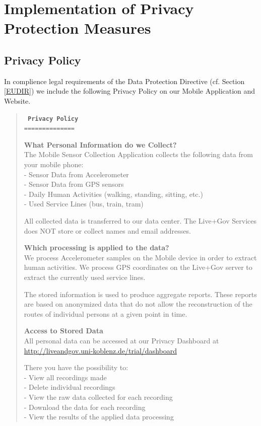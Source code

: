 \chapter{Implementation of Privacy Protection Measures}
\section{Privacy Policy} \label{sec:PP}

In complience legal requirements of the Data Protection Directive (cf. Section \ref{EUDIR}) we include the following
Privacy Policy on our Mobile Application and Website.

\begin{quote}
\tt \small
\textbf{Privacy Policy}\\
==============

\textbf{What Personal Information do we Collect?}\\
The Mobile Sensor Collection Application collects the following data from your mobile phone:\\
- Sensor Data from Accelerometer\\
- Sensor Data from GPS sensors\\
- Daily Human Activities (walking, standing, sitting, etc.)\\
- Used Service Lines (bus, train, tram)

All collected data is transferred to our data center. The Live+Gov
Services does NOT store or collect names and email addresses.

\textbf{Which processing is applied to the data?}\\
We process Accelerometer samples on the Mobile device in order to extract human activities.
We process GPS coordinates on the Live+Gov server to extract the currently used service lines.

The stored information is used to produce aggregate reports.
These reports are based on anonymized data that do not allow the reconstruction of the routes of individual persons at a given point in time.

\textbf{Access to Stored Data}\\
All personal data can be accessed at our Privacy Dashboard at
\url{http://liveandgov.uni-koblenz.de/trial/dashboard}

There you have the possibility to:\\
- View all recordings made\\
- Delete individual recordings\\
- View the raw data collected for each recording\\
- Download the data for each recording\\
- View the results of the applied data processing


\end{quote}
